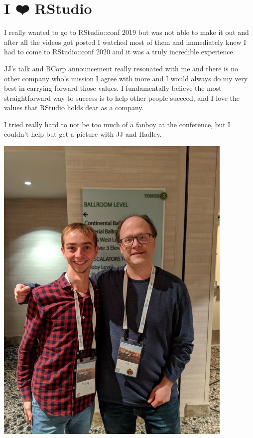 \documentclass[
]{book}
\begin{document}
\hypertarget{rstudio}{%
\section{I ❤️ RStudio}\label{rstudio}}

I really wanted to go to RStudio::conf 2019 but was not able to make it out and after all the videos got posted I watched most of them and immediately knew I had to come to RStudio::conf 2020 and it was a truly incredible experience.

JJ's talk and BCorp announcement really resonated with me and there is no other company who's mission I agree with more and I would always do my very best in carrying forward those values. I fundamentally believe the most straightforward way to success is to help other people succeed, and I love the values that RStudio holds dear as a company.

I tried really hard to not be too much of a fanboy at the conference, but I couldn't help but get a picture with JJ and Hadley.

\includegraphics{images/pic_with_jj.jpg}
\end{document}
